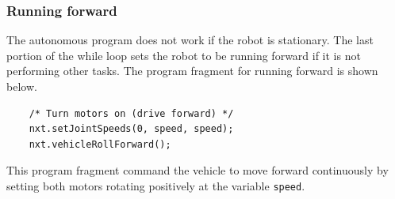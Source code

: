\subsubsection*{Running forward}
The autonomous program does not work if the robot is stationary.
The last portion of the while loop sets the robot to be running forward if it is not performing other tasks.
The program fragment for running forward is shown below.
\begin{verbatim}
    /* Turn motors on (drive forward) */
    nxt.setJointSpeeds(0, speed, speed);
    nxt.vehicleRollForward();
\end{verbatim}
This program fragment command the vehicle to move forward continuously by setting both motors rotating positively at
the variable \verb+speed+.
